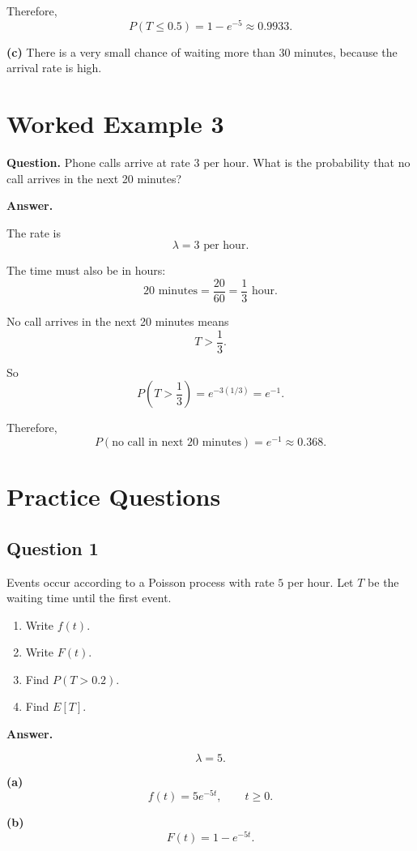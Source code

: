 \documentclass[12pt]{article}
\begin{document}
Therefore,
\[
\boxed{P(T\leq 0.5)=1-e^{-5}\approx 0.9933.}
\]

\textbf{(c)}
There is a very small chance of waiting more than 30 minutes, because the arrival rate is high.

\section{Worked Example 3}

\textbf{Question.}
Phone calls arrive at rate \(3\) per hour. What is the probability that no call arrives in the next 20 minutes?

\textbf{Answer.}

The rate is
\[
\lambda=3 \text{ per hour}.
\]

The time must also be in hours:
\[
20\text{ minutes}=\frac{20}{60}=\frac{1}{3}\text{ hour}.
\]

No call arrives in the next 20 minutes means
\[
T>\frac{1}{3}.
\]

So
\[
P\left(T>\frac{1}{3}\right)=e^{-3(1/3)}=e^{-1}.
\]

Therefore,
\[
\boxed{P(\text{no call in next 20 minutes})=e^{-1}\approx 0.368.}
\]

\section{Practice Questions}

\subsection*{Question 1}

Events occur according to a Poisson process with rate \(5\) per hour. Let \(T\) be the waiting time until the first event.

\begin{enumerate}[label=(\alph*)]
    \item Write \(f(t)\).
    \item Write \(F(t)\).
    \item Find \(P(T>0.2)\).
    \item Find \(E[T]\).
\end{enumerate}

\textbf{Answer.}

\[
\lambda=5.
\]

\textbf{(a)}
\[
\boxed{f(t)=5e^{-5t}, \qquad t\geq 0.}
\]

\textbf{(b)}
\[
\boxed{F(t)=1-e^{-5t}.}
\]
\end{document}
